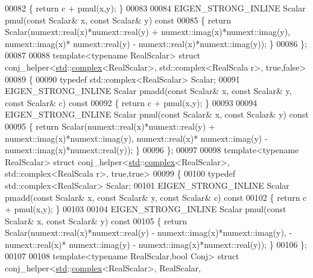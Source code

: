 \begin{DoxyCode}
00082 \textcolor{keyword}{  }\{ \textcolor{keywordflow}{return} c + pmul(x,y); \}
00083 
00084   EIGEN\_STRONG\_INLINE Scalar pmul(\textcolor{keyword}{const} Scalar& x, \textcolor{keyword}{const} Scalar& y)\textcolor{keyword}{ const}
00085 \textcolor{keyword}{  }\{ \textcolor{keywordflow}{return} Scalar(numext::real(x)*numext::real(y) + numext::imag(x)*numext::imag(y), numext::imag(x)*
      numext::real(y) - numext::real(x)*numext::imag(y)); \}
00086 \};
00087 
00088 \textcolor{keyword}{template}<\textcolor{keyword}{typename} RealScalar> \textcolor{keyword}{struct }conj\_helper<\hyperlink{namespacestd}{std}::\hyperlink{structcomplex}{complex}<RealScalar>, std::complex<RealScala
      r>, true,false>
00089 \{
00090   \textcolor{keyword}{typedef} std::complex<RealScalar> Scalar;
00091   EIGEN\_STRONG\_INLINE Scalar pmadd(\textcolor{keyword}{const} Scalar& x, \textcolor{keyword}{const} Scalar& y, \textcolor{keyword}{const} Scalar& c)\textcolor{keyword}{ const}
00092 \textcolor{keyword}{  }\{ \textcolor{keywordflow}{return} c + pmul(x,y); \}
00093 
00094   EIGEN\_STRONG\_INLINE Scalar pmul(\textcolor{keyword}{const} Scalar& x, \textcolor{keyword}{const} Scalar& y)\textcolor{keyword}{ const}
00095 \textcolor{keyword}{  }\{ \textcolor{keywordflow}{return} Scalar(numext::real(x)*numext::real(y) + numext::imag(x)*numext::imag(y), numext::real(x)*
      numext::imag(y) - numext::imag(x)*numext::real(y)); \}
00096 \};
00097 
00098 \textcolor{keyword}{template}<\textcolor{keyword}{typename} RealScalar> \textcolor{keyword}{struct }conj\_helper<\hyperlink{namespacestd}{std}::\hyperlink{structcomplex}{complex}<RealScalar>, std::complex<RealScala
      r>, true,true>
00099 \{
00100   \textcolor{keyword}{typedef} std::complex<RealScalar> Scalar;
00101   EIGEN\_STRONG\_INLINE Scalar pmadd(\textcolor{keyword}{const} Scalar& x, \textcolor{keyword}{const} Scalar& y, \textcolor{keyword}{const} Scalar& c)\textcolor{keyword}{ const}
00102 \textcolor{keyword}{  }\{ \textcolor{keywordflow}{return} c + pmul(x,y); \}
00103 
00104   EIGEN\_STRONG\_INLINE Scalar pmul(\textcolor{keyword}{const} Scalar& x, \textcolor{keyword}{const} Scalar& y)\textcolor{keyword}{ const}
00105 \textcolor{keyword}{  }\{ \textcolor{keywordflow}{return} Scalar(numext::real(x)*numext::real(y) - numext::imag(x)*numext::imag(y), - numext::real(x)*
      numext::imag(y) - numext::imag(x)*numext::real(y)); \}
00106 \};
00107 
00108 \textcolor{keyword}{template}<\textcolor{keyword}{typename} RealScalar,\textcolor{keywordtype}{bool} Conj> \textcolor{keyword}{struct }conj\_helper<\hyperlink{namespacestd}{std}::\hyperlink{structcomplex}{complex}<RealScalar>, RealScalar, 

\end{DoxyCode}
